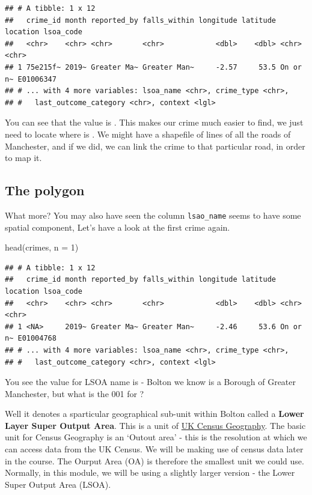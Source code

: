 \documentclass[
]{book}
\newenvironment{Shaded}{\begin{snugshade}}{\end{snugshade}}
\newcommand{\AttributeTok}[1]{\textcolor[rgb]{0.77,0.63,0.00}{#1}}
\newcommand{\DecValTok}[1]{\textcolor[rgb]{0.00,0.00,0.81}{#1}}
\newcommand{\FunctionTok}[1]{\textcolor[rgb]{0.00,0.00,0.00}{#1}}
\newcommand{\NormalTok}[1]{#1}
\begin{document}
\begin{verbatim}
## # A tibble: 1 x 12
##   crime_id month reported_by falls_within longitude latitude location lsoa_code
##   <chr>    <chr> <chr>       <chr>            <dbl>    <dbl> <chr>    <chr>    
## 1 75e215f~ 2019~ Greater Ma~ Greater Man~     -2.57     53.5 On or n~ E01006347
## # ... with 4 more variables: lsoa_name <chr>, crime_type <chr>,
## #   last_outcome_category <chr>, context <lgl>
\end{verbatim}

You can see that the value is . This makes our crime much easier to find, we just need to locate where is . We might have a shapefile of lines of all the roads of Manchester, and if we did, we can link the crime to that particular road, in order to map it.

\hypertarget{the-polygon}{%
\subsection{The polygon}\label{the-polygon}}

What more? You may also have seen the column \texttt{lsao\_name} seems to have some spatial component, Let's have a look at the first crime again.

\begin{Shaded}
\begin{Highlighting}[]
\FunctionTok{head}\NormalTok{(crimes, }\AttributeTok{n =} \DecValTok{1}\NormalTok{)}
\end{Highlighting}
\end{Shaded}

\begin{verbatim}
## # A tibble: 1 x 12
##   crime_id month reported_by falls_within longitude latitude location lsoa_code
##   <chr>    <chr> <chr>       <chr>            <dbl>    <dbl> <chr>    <chr>    
## 1 <NA>     2019~ Greater Ma~ Greater Man~     -2.46     53.6 On or n~ E01004768
## # ... with 4 more variables: lsoa_name <chr>, crime_type <chr>,
## #   last_outcome_category <chr>, context <lgl>
\end{verbatim}

You see the value for LSOA name is - Bolton we know is a Borough of Greater Manchester, but what is the 001 for ?

Well it denotes a sparticular geographical sub-unit within Bolton called a \textbf{Lower Layer Super Output Area}. This is a unit of \href{https://www.ons.gov.uk/methodology/geography/ukgeographies/censusgeography}{UK Census Geography}. The basic unit for Census Geography is an `Outout area' - this is the resolution at which we can access data from the UK Census. We will be making use of census data later in the course. The Ourput Area (OA) is therefore the smallest unit we could use. Normally, in this module, we will be using a slightly larger version - the Lower Super Output Area (LSOA).
\end{document}
